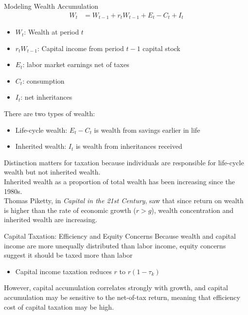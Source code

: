 \documentclass[10pt]{extarticle}
\begin{document}
  \begin{problem}{Modeling Wealth Accumulation}
    \begin{align*}
      W_{t} &= W_{t-1} + r_{t}W_{t-1} + E_t - C_t + I_t
    \end{align*}
    \begin{itemize}
      \item $W_t$: Wealth at period $t$
      \item $r_tW_{t-1}$: Capital income from period $t-1$ capital stock
      \item $E_t$: labor market earnings net of taxes
      \item $C_t$: consumption
      \item $I_t$: net inheritances
    \end{itemize}
    There are two types of wealth:
    \begin{itemize}
      \item Life-cycle wealth: $E_t-C_t$ is wealth from savings earlier in life
      \item Inherited wealth: $I_t$ is wealth from inheritances received
    \end{itemize}
    Distinction matters for taxation because individuals are responsible for life-cycle wealth but not inherited wealth.\\

    Inherited wealth as a proportion of total wealth has been increasing since the 1980s.\\

    Thomas Piketty, in \textit{Capital in the 21st Century}, saw that since return on wealth is higher than the rate of economic growth ($r > g$), wealth concentration and inherited wealth are increasing.
  \end{problem}
  \begin{problem}{Capital Taxation: Efficiency and Equity Concerns}
    Because wealth and capital income are more unequally distributed than labor income, equity concerns suggest it should be taxed more than labor
    \begin{itemize}
      \item Capital income taxation reduces $r$ to $r(1-\tau_k)$
    \end{itemize}
    However, capital accumulation correlates strongly with growth, and capital accumulation may be sensitive to the net-of-tax return, meaning that efficiency cost of capital taxation may be high.
  \end{problem}
\end{document}
